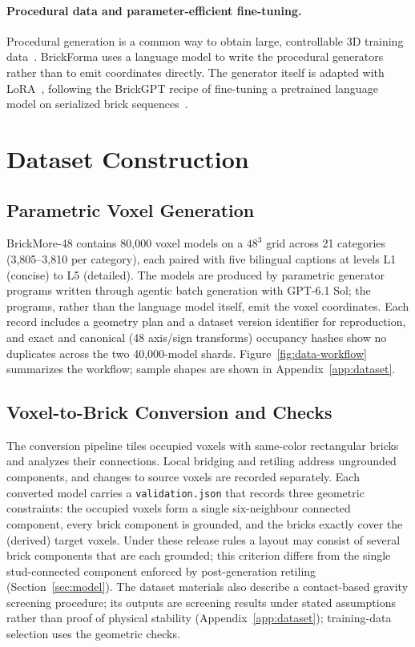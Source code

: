 \documentclass[letterpaper]{article} %
\begin{document}
\paragraph{Procedural data and parameter-efficient fine-tuning.}
Procedural generation is a common way to obtain large, controllable 3D training data~\cite{infinigen}. BrickForma uses a language model to write the procedural generators rather than to emit coordinates directly. The generator itself is adapted with LoRA~\cite{lora}, following the BrickGPT recipe of fine-tuning a pretrained language model on serialized brick sequences~\cite{brickgpt}.

\section{Dataset Construction}
\label{sec:dataset}
\subsection{Parametric Voxel Generation}
BrickMore-48 contains 80,000 voxel models on a $48^3$ grid across 21 categories (3,805--3,810 per category), each paired with five bilingual captions at levels L1 (concise) to L5 (detailed). The models are produced by parametric generator programs written through agentic batch generation with GPT-6.1 Sol; the programs, rather than the language model itself, emit the voxel coordinates. Each record includes a geometry plan and a dataset version identifier for reproduction, and exact and canonical (48 axis/sign transforms) occupancy hashes show no duplicates across the two 40,000-model shards. Figure~\ref{fig:data-workflow} summarizes the workflow; sample shapes are shown in Appendix~\ref{app:dataset}.


\subsection{Voxel-to-Brick Conversion and Checks}
The conversion pipeline tiles occupied voxels with same-color rectangular bricks and analyzes their connections. Local bridging and retiling address ungrounded components, and changes to source voxels are recorded separately. Each converted model carries a \texttt{validation.json} that records three geometric constraints: the occupied voxels form a single six-neighbour connected component, every brick component is grounded, and the bricks exactly cover the (derived) target voxels. Under these release rules a layout may consist of several brick components that are each grounded; this criterion differs from the single stud-connected component enforced by post-generation retiling (Section~\ref{sec:model}). The dataset materials also describe a contact-based gravity screening procedure; its outputs are screening results under stated assumptions rather than proof of physical stability (Appendix~\ref{app:dataset}); training-data selection uses the geometric checks.
\end{document}
